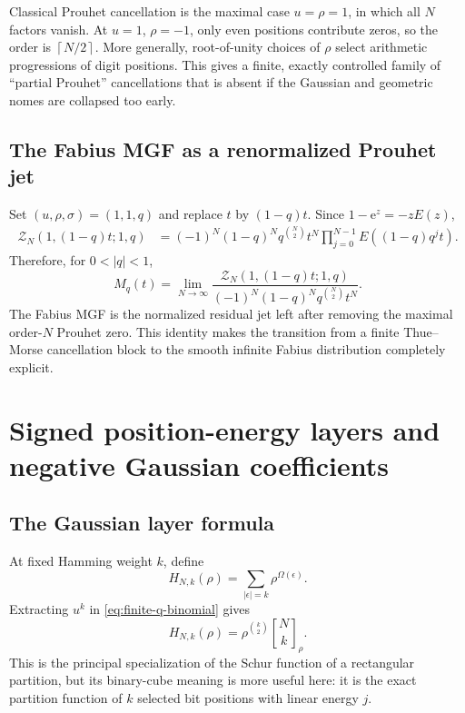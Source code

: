 \documentclass[11pt,oneside]{article}
\numberwithin{equation}{section}
\theoremstyle{definition}
\theoremstyle{remark}
\newcommand{\e}{\mathrm e}
\newcommand{\qbinom}[3]{\genfrac{[}{]}{0pt}{}{#1}{#2}_{#3}}
\newcommand{\ceil}[1]{\left\lceil#1\right\rceil}
\newcommand{\Zpart}{\mathscr Z}
\begin{document}
Classical Prouhet cancellation is the maximal case $u=\rho=1$, in which all
$N$ factors vanish.  At $u=1$, $\rho=-1$, only even positions contribute
zeros, so the order is $\ceil{N/2}$.  More generally, root-of-unity choices of
$\rho$ select arithmetic progressions of digit positions.  This gives a
finite, exactly controlled family of ``partial Prouhet'' cancellations that is
absent if the Gaussian and geometric nomes are collapsed too early.

\subsection{The Fabius MGF as a renormalized Prouhet jet}

Set $(u,\rho,\sigma)=(1,1,q)$ and replace $t$ by $(1-q)t$.  Since
$1-\e^z=-zE(z)$,
\begin{align}
 \Zpart_N(1,(1-q)t;1,q)
 &=(-1)^N(1-q)^Nq^{\binom N2}t^N
   \prod_{j=0}^{N-1}E((1-q)q^jt).
 \label{eq:Z-renormalized-finite}
\end{align}
Therefore, for $0<|q|<1$,
\begin{equation}
 \boxed{
 M_q(t)=\lim_{N\to\infty}
 \frac{\Zpart_N(1,(1-q)t;1,q)}
 {(-1)^N(1-q)^Nq^{\binom N2}t^N}.}
 \label{eq:M-renormalized-Prouhet}
\end{equation}
The Fabius MGF is the normalized residual jet left after removing the maximal
order-$N$ Prouhet zero.  This identity makes the transition from a finite
Thue--Morse cancellation block to the smooth infinite Fabius distribution
completely explicit.

\section{Signed position-energy layers and negative Gaussian coefficients}
\label{sec:position-energy}

\subsection{The Gaussian layer formula}

At fixed Hamming weight $k$, define
\begin{equation}
 H_{N,k}(\rho)=
 \sum_{|\epsilon|=k}\rho^{\Omega(\epsilon)}.
 \label{eq:H-Nk}
\end{equation}
Extracting $u^k$ in \eqref{eq:finite-q-binomial} gives
\begin{equation}
 \boxed{
 H_{N,k}(\rho)=
 \rho^{\binom k2}\qbinom{N}{k}{\rho}.}
 \label{eq:H-Gaussian}
\end{equation}
This is the principal specialization of the Schur function of a rectangular
partition, but its binary-cube meaning is more useful here: it is the exact
partition function of $k$ selected bit positions with linear energy $j$.
\end{document}
